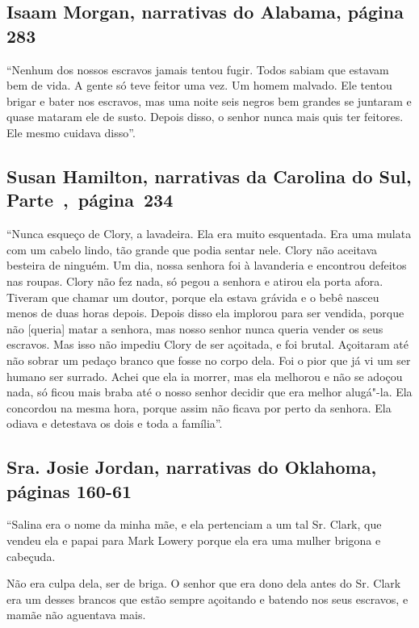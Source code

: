 \subsection{Isaam Morgan, narrativas do Alabama, página 283}
\label{ref201}

``Nenhum dos nossos escravos jamais tentou fugir. Todos sabiam que
estavam bem de vida. A gente só teve feitor uma vez. Um homem malvado.
Ele tentou brigar e bater nos escravos, mas uma noite seis negros bem
grandes se juntaram e quase mataram ele de susto. Depois disso, o senhor
nunca mais quis ter feitores. Ele mesmo cuidava disso''.

\subsection{Susan Hamilton, narrativas da Carolina do Sul, Parte~,~página~234}
\label{ref121}

``Nunca esqueço de Clory, a lavadeira. Ela era muito esquentada. Era uma
mulata com um cabelo lindo, tão grande que podia sentar nele. Clory não
aceitava besteira de ninguém. Um dia, nossa senhora foi à lavanderia e
encontrou defeitos nas roupas. Clory não fez nada, só pegou a senhora e
atirou ela porta afora. Tiveram que chamar um doutor, porque ela estava
grávida e o bebê nasceu menos de duas horas depois. Depois disso ela
implorou para ser vendida, porque não {[}queria{]} matar a senhora, mas
nosso senhor nunca queria vender os seus escravos. Mas isso não impediu
Clory de ser açoitada, e foi brutal. Açoitaram até não sobrar um pedaço
branco que fosse no corpo dela. Foi o pior que já vi um ser humano ser
surrado. Achei que ela ia morrer, mas ela melhorou e não se adoçou nada,
só ficou mais braba até o nosso senhor decidir que era melhor alugá"-la.
Ela concordou na mesma hora, porque assim não ficava por perto da
senhora. Ela odiava e detestava os dois e toda a família''.

\subsection{Sra. Josie Jordan, narrativas do Oklahoma, páginas 160-61}
\label{ref165}

``Salina era o nome da minha mãe, e ela pertenciam a um tal Sr. Clark,
que vendeu ela e papai para Mark Lowery porque ela era uma mulher
brigona e cabeçuda.

Não era culpa dela, ser de briga. O senhor que era dono dela antes do
Sr. Clark era um desses brancos que estão sempre açoitando e batendo nos
seus escravos, e mamãe não aguentava mais.

